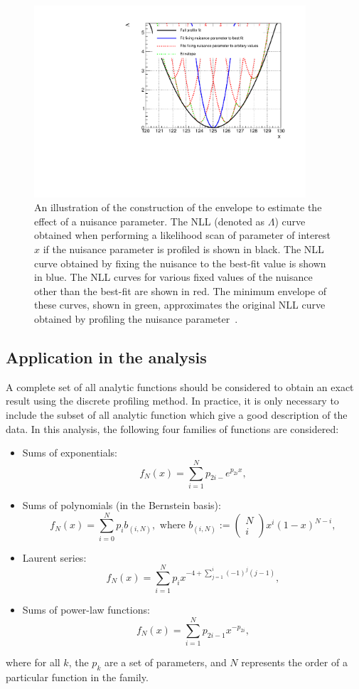 \begin{figure}[ht!]
\centering
\includegraphics[width=0.9\textwidth]{modellingFigures/envelope_cartoon.pdf} 
\caption{An illustration of the construction of the envelope to estimate the effect of a nuisance parameter. The NLL (denoted as $\Lambda$) curve obtained when performing a likelihood scan of parameter of interest $x$ if the nuisance parameter is profiled is shown in black. The NLL curve obtained by fixing the nuisance to the best-fit value is shown in blue. The NLL curves for various fixed values of the nuisance other than the best-fit are shown in red. The minimum envelope of these curves, shown in green, approximates the original NLL curve obtained by profiling the nuisance parameter~\cite{DiscreteProfiling}.}

\label{fig:model:bkg_envelope}
\end{figure}

\subsection{Application in the \Hgg analysis}

A complete set of all analytic functions should be considered to obtain an exact result using the discrete profiling method. In practice, it is only necessary to include the subset of all analytic function which give a good description of the data. In this analysis, the following four families of functions are considered:

\begin{itemize}
\item Sums of exponentials: $$ f_{N}(x)= \sum^{N}_{i=1} p_{2i-} e^{p_{2i} x} ,$$
\item Sums of polynomials (in the Bernstein basis): $$ f_{N}(x) = \sum^{N}_{i=0} p_{i} b_{(i,N)}, \text{ where } b_{(i,N)}:= \begin{pmatrix} N \\ i \end{pmatrix} x^i (1-x)^{N-i} ,$$
\item Laurent series: $$ f_{N}(x)= \sum^{N}_{i=1} p_{i} x^{-4 + \sum^{i}_{j=1} (-1)^{j} (j-1)},$$
\item Sums of power-law functions: $$ f_{N}(x)= \sum^{N}_{i=1} p_{2i-1} x^{-p_{2i}},$$
\end{itemize}
where for all $k$, the $p_k$ are a set of parameters, and $N$ represents the order of a particular function in the family.  

